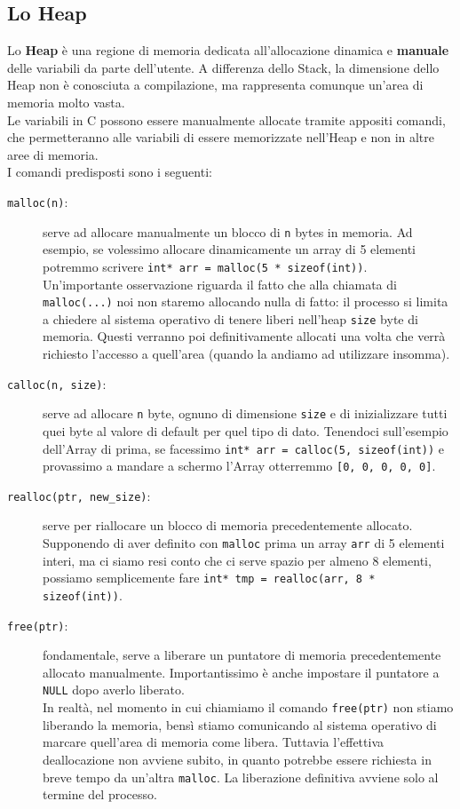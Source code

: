 \documentclass[12pt]{report}
\begin{document}
	\subsection{Lo Heap}
	Lo \textbf{Heap} è una regione di memoria dedicata all'allocazione dinamica e \textbf{manuale} delle variabili da parte dell'utente. A differenza dello Stack, la dimensione dello Heap non è conosciuta a compilazione, ma rappresenta comunque un'area di memoria molto vasta.\\
	Le variabili in C possono essere manualmente allocate tramite appositi comandi, che permetteranno alle variabili di essere memorizzate nell'Heap e non in altre aree di memoria.\\
	I comandi predisposti sono i seguenti:
	\begin{description}
		\item [\texttt{malloc(n)}:] serve ad allocare manualmente un blocco di \texttt{n} bytes in memoria. Ad esempio, se volessimo allocare dinamicamente un array di 5 elementi potremmo scrivere \texttt{int* arr = malloc(5 * sizeof(int))}.\\
		Un'importante osservazione riguarda il fatto che alla chiamata di \texttt{malloc(...)} noi non staremo allocando nulla di fatto: il processo si limita a chiedere al sistema operativo di tenere liberi nell'heap \texttt{size} byte di memoria. Questi verranno poi definitivamente allocati una volta che verrà richiesto l'accesso a quell'area (quando la andiamo ad utilizzare insomma).
		
		\item[\texttt{calloc(n, size)}:] serve ad allocare \texttt{n} byte, ognuno di dimensione \texttt{size} e di inizializzare tutti quei byte al valore di default per quel tipo di dato. Tenendoci sull'esempio dell'Array di prima, se facessimo \texttt{int* arr = calloc(5, sizeof(int))} e provassimo a mandare a schermo l'Array otterremmo \texttt{[0, 0, 0, 0, 0]}.
		
		\item[\texttt{realloc(ptr, new\_size)}:] serve per riallocare un blocco di memoria precedentemente allocato. Supponendo di aver definito con \texttt{malloc} prima un array \texttt{arr} di 5 elementi interi, ma ci siamo resi conto che ci serve spazio per almeno 8 elementi, possiamo semplicemente fare \texttt{int* tmp = realloc(arr, 8 * sizeof(int))}.
		
		\item[\texttt{free(ptr)}:] fondamentale, serve a liberare un puntatore di memoria precedentemente allocato manualmente. Importantissimo è anche impostare il puntatore a \texttt{NULL} dopo averlo liberato.\\
		In realtà, nel momento in cui chiamiamo il comando \texttt{free(ptr)} non stiamo liberando la memoria, bensì stiamo comunicando al sistema operativo di marcare quell'area di memoria come libera. Tuttavia l'effettiva deallocazione non avviene subito, in quanto potrebbe essere richiesta in breve tempo da un'altra \texttt{malloc}. La liberazione definitiva avviene solo al termine del processo.
	\end{description}
	
\end{document}
